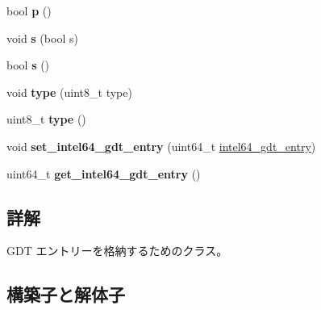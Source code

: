 \begin{DoxyCompactItemize}
\item 
\hypertarget{classintel64__gdt__entry_a0adf7b16955754751bfe59a05ef692a5}{}\label{classintel64__gdt__entry_a0adf7b16955754751bfe59a05ef692a5} 
bool {\bfseries p} ()
\item 
\hypertarget{classintel64__gdt__entry_af6430996694a587bdc57335297c8e9cd}{}\label{classintel64__gdt__entry_af6430996694a587bdc57335297c8e9cd} 
void {\bfseries s} (bool s)
\item 
\hypertarget{classintel64__gdt__entry_a75d1cf3eb67ccf2f306767f192e351de}{}\label{classintel64__gdt__entry_a75d1cf3eb67ccf2f306767f192e351de} 
bool {\bfseries s} ()
\item 
\hypertarget{classintel64__gdt__entry_a428581468922f870546bf869f2cbcd9d}{}\label{classintel64__gdt__entry_a428581468922f870546bf869f2cbcd9d} 
void {\bfseries type} (uint8\+\_\+t type)
\item 
\hypertarget{classintel64__gdt__entry_aa3a3105645899970210c9d34666308c3}{}\label{classintel64__gdt__entry_aa3a3105645899970210c9d34666308c3} 
uint8\+\_\+t {\bfseries type} ()
\item 
\hypertarget{classintel64__gdt__entry_a5ddcc33ab1383647c7dba9da5ac4c939}{}\label{classintel64__gdt__entry_a5ddcc33ab1383647c7dba9da5ac4c939} 
void {\bfseries set\+\_\+intel64\+\_\+gdt\+\_\+entry} (uint64\+\_\+t \hyperlink{classintel64__gdt__entry}{intel64\+\_\+gdt\+\_\+entry})
\item 
\hypertarget{classintel64__gdt__entry_a8731545e6e0a5414574e33863cfd5960}{}\label{classintel64__gdt__entry_a8731545e6e0a5414574e33863cfd5960} 
uint64\+\_\+t {\bfseries get\+\_\+intel64\+\_\+gdt\+\_\+entry} ()
\end{DoxyCompactItemize}


\subsection{詳解}
G\+DT エントリーを格納するためのクラス。 

\subsection{構築子と解体子}
\hypertarget{classintel64__gdt__entry_a7c74c82d45bad2c2f64a3cfa16691ee5}{}\label{classintel64__gdt__entry_a7c74c82d45bad2c2f64a3cfa16691ee5} 
